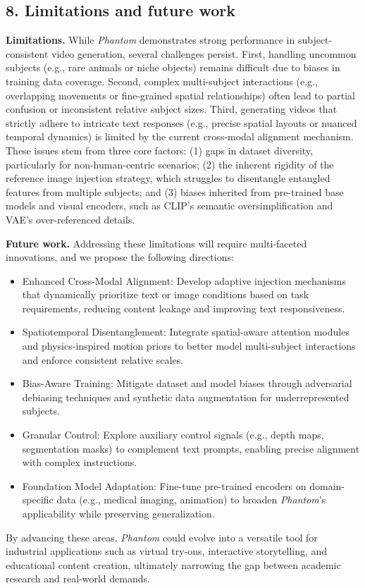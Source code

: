 \subsection*{8. Limitations and future work}
\label{sec:supp:limitations}
\textbf{Limitations.} While \textit{Phantom} demonstrates strong performance in subject-consistent video generation, several challenges persist. First, handling uncommon subjects (e.g., rare animals or niche objects) remains difficult due to biases in training data coverage. Second, complex multi-subject interactions (e.g., overlapping movements or fine-grained spatial relationships) often lead to partial confusion or inconsistent relative subject sizes. Third, generating videos that strictly adhere to intricate text responses (e.g., precise spatial layouts or nuanced temporal dynamics) is limited by the current cross-modal alignment mechanism. These issues stem from three core factors: (1) gaps in dataset diversity, particularly for non-human-centric scenarios; (2) the inherent rigidity of the reference image injection strategy, which struggles to disentangle entangled features from multiple subjects; and (3) biases inherited from pre-trained base models and visual encoders, such as CLIP’s semantic oversimplification and VAE’s over-referenced details. 

\noindent \textbf{Future work.} Addressing these limitations will require multi-faceted innovations, and we propose the following directions: 

\begin{itemize}
    \item Enhanced Cross-Modal Alignment: Develop adaptive injection mechanisms that dynamically prioritize text or image conditions based on task requirements, reducing content leakage and improving text responsiveness. 
    
    \item Spatiotemporal Disentanglement: Integrate spatial-aware attention modules and physics-inspired motion priors to better model multi-subject interactions and enforce consistent relative scales. 
    
    \item Bias-Aware Training: Mitigate dataset and model biases through adversarial debiasing techniques and synthetic data augmentation for underrepresented subjects. 
    
    \item Granular Control: Explore auxiliary control signals (e.g., depth maps, segmentation masks) to complement text prompts, enabling precise alignment with complex instructions. 
    
    \item Foundation Model Adaptation: Fine-tune pre-trained encoders on domain-specific data (e.g., medical imaging, animation) to broaden \textit{Phantom}’s applicability while preserving generalization. 
\end{itemize}

By advancing these areas, \textit{Phantom} could evolve into a versatile tool for industrial applications such as virtual try-ons, interactive storytelling, and educational content creation, ultimately narrowing the gap between academic research and real-world demands.